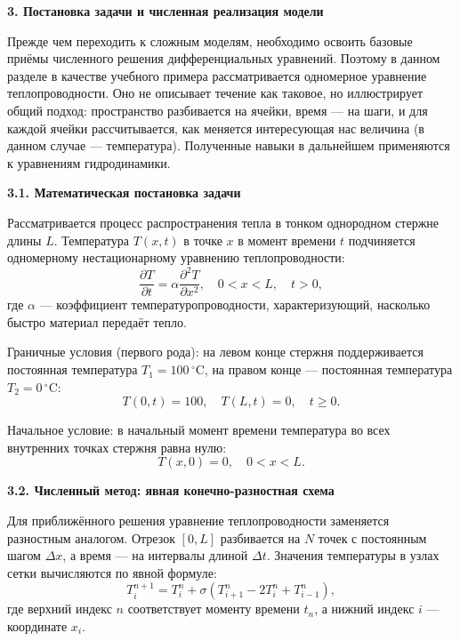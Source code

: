 \documentclass[a4paper,14pt]{extarticle}
\begin{document}
\begin{center}
    \textbf{\large 3. Постановка задачи и численная реализация модели}
\end{center}

\noindent Прежде чем переходить к сложным моделям, необходимо освоить базовые приёмы численного решения дифференциальных уравнений. Поэтому в данном разделе в качестве учебного примера рассматривается одномерное уравнение теплопроводности. Оно не описывает течение как таковое, но иллюстрирует общий подход: пространство разбивается на ячейки, время — на шаги, и для каждой ячейки рассчитывается, как меняется интересующая нас величина (в данном случае — температура). Полученные навыки в дальнейшем применяются к уравнениям гидродинамики.

\vspace{\baselineskip}

\noindent \textbf{3.1. Математическая постановка задачи}

\noindent Рассматривается процесс распространения тепла в тонком однородном стержне длины $L$. Температура $T(x,t)$ в точке $x$ в момент времени $t$ подчиняется одномерному нестационарному уравнению теплопроводности:
\begin{equation}
    \frac{\partial T}{\partial t} = \alpha \frac{\partial^2 T}{\partial x^2}, \quad 0 < x < L, \quad t > 0,
\end{equation}
где $\alpha$ — коэффициент температуропроводности, характеризующий, насколько быстро материал передаёт тепло. 

Граничные условия (первого рода): на левом конце стержня поддерживается постоянная температура $T_1 = 100 \, ^{\circ}\text{C}$, на правом конце — постоянная температура $T_2 = 0 \, ^{\circ}\text{C}$:
\begin{equation}
    T(0,t) = 100, \quad T(L,t) = 0, \quad t \ge 0.
\end{equation}

Начальное условие: в начальный момент времени температура во всех внутренних точках стержня равна нулю:
\begin{equation}
    T(x,0) = 0, \quad 0 < x < L.
\end{equation}

\vspace{\baselineskip}

\noindent \textbf{3.2. Численный метод: явная конечно-разностная схема}

\noindent Для приближённого решения уравнение теплопроводности заменяется разностным аналогом. Отрезок $[0, L]$ разбивается на $N$ точек с постоянным шагом $\Delta x$, а время — на интервалы длиной $\Delta t$. Значения температуры в узлах сетки вычисляются по явной формуле:
\begin{equation}
    T_i^{n+1} = T_i^n + \sigma \left( T_{i+1}^n - 2T_i^n + T_{i-1}^n \right),
\end{equation}
где верхний индекс $n$ соответствует моменту времени $t_n$, а нижний индекс $i$ — координате $x_i$.
\end{document}
